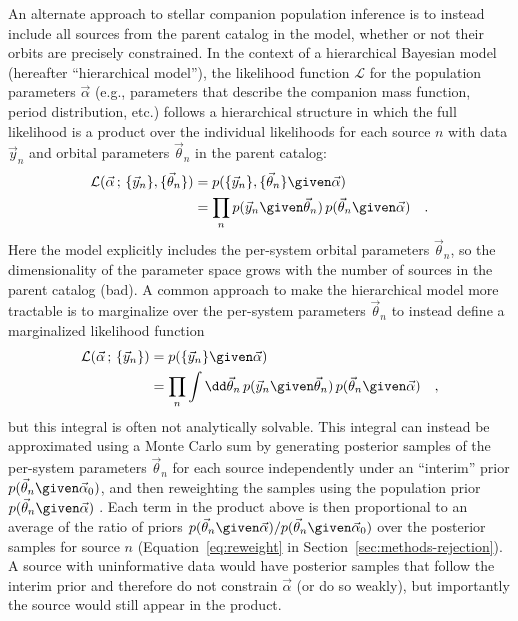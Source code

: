 \documentclass[twocolumn]{AASTeX7/aastex701}
\begin{document}
An alternate approach to stellar companion population inference is to instead include
all sources from the parent catalog in the model, whether or not their orbits are
precisely constrained.
In the context of a hierarchical Bayesian model (hereafter ``hierarchical model''), the
likelihood function $\mathcal{L}$ for the population parameters $\vec{\alpha}$ (e.g.,
parameters that describe the companion mass function, period distribution, etc.) follows
a hierarchical structure in which the full likelihood is a product over the individual
likelihoods for each source $n$ with data $\vec{y}_n$ and orbital parameters
$\vec{\theta}_n$ in the parent catalog:
\begin{align}
  \mathcal{L}(\vec{\alpha} \,;\, \{\vec{y}_n\}, \{\vec{\theta}_n\}) &=
    p(\{\vec{y}_n\}, \{\vec{\theta}_n\} \given \vec{\alpha}) \\
    &= \prod_n p(\vec{y}_n \given \vec{\theta}_n) \, p(\vec{\theta}_n \given \vec{\alpha})
    \quad .
\end{align}
Here the model explicitly includes the per-system orbital parameters $\vec{\theta}_n$,
so the dimensionality of the parameter space grows with the number of sources in the
parent catalog (bad).
A common approach to make the hierarchical model more tractable is to marginalize over
the per-system parameters $\vec{\theta}_n$ to instead define a marginalized likelihood
function
\begin{align}
  \mathcal{L}(\vec{\alpha} \,;\, \{\vec{y}_n\}) &=
    p(\{\vec{y}_n\} \given \vec{\alpha}) \\
  &= \prod_n
    \int \dd\vec{\theta}_n \,
      p(\vec{y}_n \given \vec{\theta}_n) \, p(\vec{\theta}_n \given \vec{\alpha})
    \quad ,
  \label{eq:pop-marginal}
\end{align}
but this integral is often not analytically solvable.
This integral can instead be approximated using a Monte Carlo sum by generating
posterior samples of the per-system parameters $\vec{\theta}_n$ for each source
independently under an ``interim'' prior $p(\vec{\theta}_n \given \vec{\alpha}_0)$, and
then reweighting the samples using the population prior $p(\vec{\theta}_n \given
\vec{\alpha})$ \citep[e.g.,][]{Hogg:2010, Foreman-Mackey:2014, Price-Whelan:2020}.
Each term in the product above is then proportional to an average of the ratio of priors
$p(\vec{\theta}_n \given \vec{\alpha}) / p(\vec{\theta}_n \given \vec{\alpha}_0)$ over
the posterior samples for source $n$ (Equation~\ref{eq:reweight} in
Section~\ref{sec:methods-rejection}).
A source with uninformative data would have posterior samples that follow the interim
prior and therefore do not constrain $\vec{\alpha}$ (or do so weakly), but importantly
the source would still appear in the product.
\end{document}
